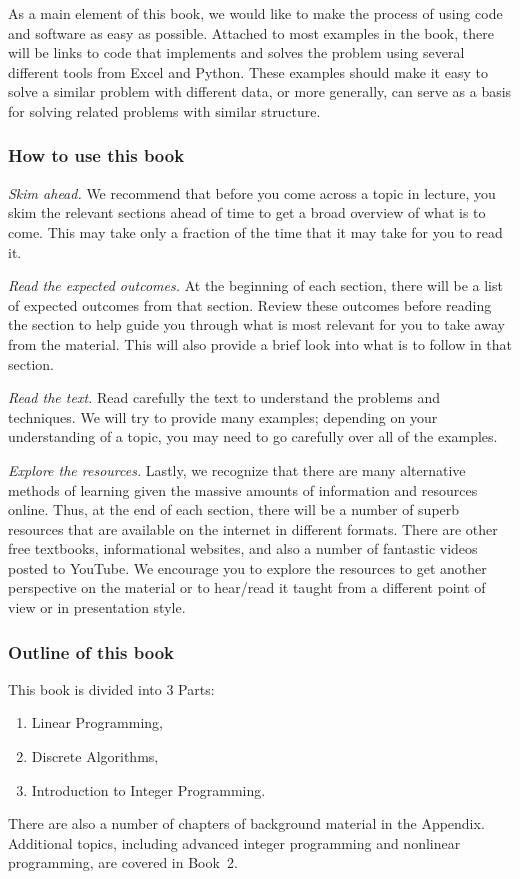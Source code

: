 As a main element of this book, we would like to make the process of using code and software as easy as possible.  Attached to most examples in the book, there will be links to code that implements and solves the problem using several different tools from Excel and Python.  These examples should make it easy to solve a similar problem with different data, or more generally, can serve as a basis for solving related problems with similar structure.

\subsubsection*{How to use this book}

\emph{Skim ahead.} We recommend that before you come across a topic in lecture, you skim the relevant sections ahead of time to get a broad overview of what is to come.   This may take only a fraction of the time that it may take for you to read it.

\emph{Read the expected outcomes.} At the beginning of each section, there will be a list of expected outcomes from that section.  Review these outcomes before reading the section to help guide you through what is most relevant for you to take away from the material.  This will also provide a brief look into what is to follow in that section.

\emph{Read the text.} Read carefully the text to understand the problems and techniques.  We will try to provide many examples; depending on your understanding of a topic, you may need to go carefully over all of the examples.

\emph{Explore the resources.} Lastly, we recognize that there are many alternative methods of learning given the massive amounts of information and resources online.   Thus, at the end of each section, there will be a number of superb resources that are available on the internet in different formats.   There are other free textbooks, informational websites, and also a number of fantastic videos posted to YouTube.  We encourage you to explore the resources to get another perspective on the material or to hear/read it taught from a different point of view or in presentation style.  

\subsubsection*{Outline of this book}
This book is divided into 3 Parts:

\begin{enumerate}
\item[Part I] Linear Programming,
\item[Part II] Discrete Algorithms,
\item[Part III] Introduction to Integer Programming.
\end{enumerate}
There are also a number of chapters of background material in the Appendix.  Additional topics, including advanced integer programming and nonlinear programming, are covered in Book~2.

